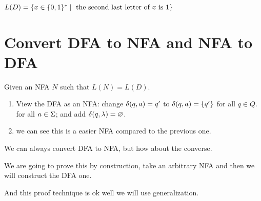\documentclass[11pt, cyan, night, 0.5in]{LatexTemplate/hw}
\begin{document}

$L(D)=\{x\in\{0,1\}^*\mid\text{ the second last letter of $x$ is 1}\}$

\section{Convert DFA to NFA and NFA to DFA}

Given an NFA $N$ such that $L(N)=L(D)$.

\begin{enumerate}
    \item View the DFA as an NFA: change $\delta(q,a)=q'$ to $\delta(q,a)=\{q'\}$ for all $q\in Q.$ for all $a\in \Sigma$; and add $\delta(q,\lambda)=\varnothing$.
    \item {} we can see this is a easier NFA compared to the previous one.
\end{enumerate}

We can always convert DFA to NFA, but how about the converse. 


We are going to prove this by construction, take an arbitrary NFA and then we will construct the DFA one.

And this proof technique is ok well we will use generalization.
\end{document}
